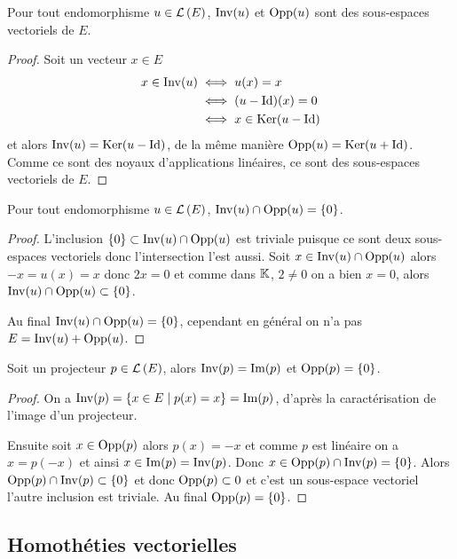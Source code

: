 \begin{prop}
  Pour tout endomorphisme \(u \in \mathcal{L}\left(E\right)\), \(\operatorname{Inv}(u)\) et \(\operatorname{Opp}(u)\) sont 
  des sous-espaces vectoriels de \(E\).
\end{prop}
\begin{proof}
  Soit un vecteur \(x \in E\)
  \begin{align}
    x \in \operatorname{Inv}(u) &\iff u(x) = x \\
    &\iff (u-\operatorname{Id})(x)=0 \\
    &\iff x \in \operatorname{Ker}(u-\operatorname{Id})
  \end{align}
  et alors \(\operatorname{Inv}(u) = \operatorname{Ker}(u-\operatorname{Id})\), de la même manière \(\operatorname{Opp}(u) = 
  \operatorname{Ker}(u+\operatorname{Id})\). Comme ce sont des noyaux d'applications linéaires, ce sont des 
  sous-espaces vectoriels de \(E\).
\end{proof}

\begin{prop}
  Pour tout endomorphisme \(u \in \mathcal{L}\left(E\right)\), \(\operatorname{Inv}(u) \cap \operatorname{Opp}(u) = \{0\}\).
\end{prop}
\begin{proof}
  L'inclusion \(\{0\} \subset \operatorname{Inv}(u) \cap \operatorname{Opp}(u)\) est triviale puisque ce 
  sont deux sous-espaces vectoriels donc l'intersection l'est aussi. Soit \(x 
  \in \operatorname{Inv}(u) \cap \operatorname{Opp}(u)\) alors \(-x=u(x)=x\) donc \(2x=0\) et comme dans 
  \(\mathbb{K}\), \(2\neq 0\) on a bien \(x=0\), alors \(\operatorname{Inv}(u) \cap \operatorname{Opp}(u) \subset 
  \{0\}\).

  Au final \(\operatorname{Inv}(u) \cap \operatorname{Opp}(u) = \{0\}\), cependant en général on n'a pas \(E 
  = \operatorname{Inv}(u)+\operatorname{Opp}(u)\).
\end{proof}

\begin{prop}
  Soit un projecteur \(p \in \mathcal{L}\left(E\right)\), alors \(\operatorname{Inv}(p)=\operatorname{Im}(p)\) et 
  \(\operatorname{Opp}(p)=\{0\}\).
\end{prop}
\begin{proof}
  On a \(\operatorname{Inv}(p)=\left\{x \in E\mathrel{}\middle|\mathrel{}p(x)=x\right\}=\operatorname{Im}(p)\), d'après la caractérisation 
  de l'image d'un projecteur.

  Ensuite soit \(x \in \operatorname{Opp}(p)\) alors \(p(x)=-x\) et comme \(p\) est linéaire 
  on a \(x=p(-x)\) et ainsi \(x \in \operatorname{Im}(p)=\operatorname{Inv}(p)\). Donc \(x \in \operatorname{Opp}(p) 
  \cap \operatorname{Inv}(p)= \{0\}\).
  Alors \(\operatorname{Opp}(p) \cap \operatorname{Inv}(p) \subset \{0\}\) et donc \(\operatorname{Opp}(p) \subset {0}\) 
  et c'est un sous-espace vectoriel l'autre inclusion est triviale. Au final  
  \(\operatorname{Opp}(p)=\{0\}\).
\end{proof}

\subsection{Homothéties vectorielles}

